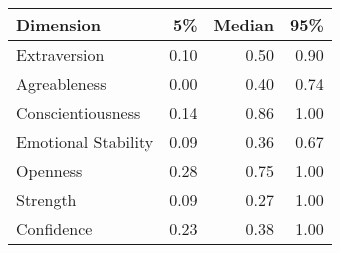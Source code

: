\begin{tabular}{lrrr}
\toprule
           Dimension &    5\% &  Median &   95\% \\
\midrule
        Extraversion &  0.10 &    0.50 &  0.90 \\
        Agreableness &  0.00 &    0.40 &  0.74 \\
   Conscientiousness &  0.14 &    0.86 &  1.00 \\
 Emotional Stability &  0.09 &    0.36 &  0.67 \\
            Openness &  0.28 &    0.75 &  1.00 \\
            Strength &  0.09 &    0.27 &  1.00 \\
          Confidence &  0.23 &    0.38 &  1.00 \\
\bottomrule
\end{tabular}
